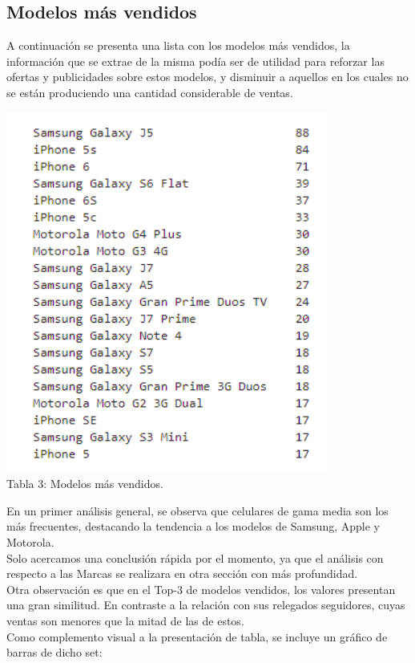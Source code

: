 \documentclass[a4paper ,12pt]{article}
\begin{document}
\subsection{Modelos más vendidos}


A continuación se presenta una lista con los modelos más vendidos, la información que se extrae de la misma podía ser de utilidad para reforzar las ofertas y publicidades sobre estos modelos, y disminuir a aquellos en los cuales no se están produciendo una cantidad considerable de ventas.\\

\begin{center}
	\includegraphics[width=0.6\linewidth]{table_3}
	\\Tabla 3: Modelos más vendidos.
	
\end{center}

En un primer análisis general, se observa que celulares de gama media son los más frecuentes, destacando la tendencia a los modelos de Samsung, Apple y Motorola.\\


Solo acercamos una conclusión rápida por el momento, ya que el análisis con respecto a las Marcas se realizara en otra sección con más profundidad.\\



Otra observación es que en el Top-3 de modelos vendidos, los valores presentan una gran similitud. En contraste a la relación con sus relegados seguidores, cuyas ventas son menores que la mitad de las de estos.\\

Como complemento visual a la presentación de tabla, se incluye un gráfico de barras de dicho set:\\
\end{document}
